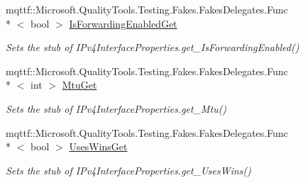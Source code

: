 \begin{DoxyCompactItemize}
mqttf\-::\-Microsoft.\-Quality\-Tools.\-Testing.\-Fakes.\-Fakes\-Delegates.\-Func\\*
$<$ bool $>$ \hyperlink{class_system_1_1_net_1_1_network_information_1_1_fakes_1_1_stub_i_pv4_interface_properties_a9afeaa06ad4e2643362836b1352d1dbe}{Is\-Forwarding\-Enabled\-Get}
\begin{DoxyCompactList}\small\item\em Sets the stub of I\-Pv4\-Interface\-Properties.\-get\-\_\-\-Is\-Forwarding\-Enabled()\end{DoxyCompactList}\item 
mqttf\-::\-Microsoft.\-Quality\-Tools.\-Testing.\-Fakes.\-Fakes\-Delegates.\-Func\\*
$<$ int $>$ \hyperlink{class_system_1_1_net_1_1_network_information_1_1_fakes_1_1_stub_i_pv4_interface_properties_a93ca9901449e7e0c89efd044ade7e002}{Mtu\-Get}
\begin{DoxyCompactList}\small\item\em Sets the stub of I\-Pv4\-Interface\-Properties.\-get\-\_\-\-Mtu()\end{DoxyCompactList}\item 
mqttf\-::\-Microsoft.\-Quality\-Tools.\-Testing.\-Fakes.\-Fakes\-Delegates.\-Func\\*
$<$ bool $>$ \hyperlink{class_system_1_1_net_1_1_network_information_1_1_fakes_1_1_stub_i_pv4_interface_properties_aa1d467cdd1aa0bd3bdec1d9194607f3b}{Uses\-Wins\-Get}
\begin{DoxyCompactList}\small\item\em Sets the stub of I\-Pv4\-Interface\-Properties.\-get\-\_\-\-Uses\-Wins()\end{DoxyCompactList}\end{DoxyCompactItemize}
